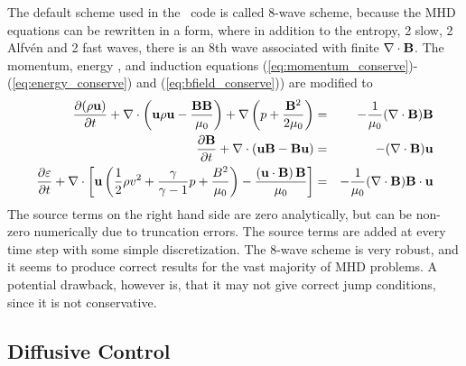 The default scheme used in the \BATSRUS\ code is called 8-wave scheme,
because the MHD equations can be rewritten in a form, where in addition
to the entropy, 2 slow, 2 Alfv\'en and 2 fast waves, there is an 8th 
wave associated with finite $\nabla\cdot\mathbf{B}$. The momentum, 
energy , and induction 
equations 
 (\ref{eq:momentum_conserve})- (\ref{eq:energy_conserve}) 
and (\ref{eq:bfield_conserve}))
are modified to
\begin{eqnarray}
  \frac{\partial (\rho\mathbf{u})}{\partial t}+
      \nabla\cdot\left(\mathbf{u}\rho\mathbf{u} - \frac{\mathbf{B}\mathbf{B}}{\mu_0}\right) + 
      \nabla\left(p + \frac{\mathbf{B}^2}{2\mu_0}\right)
      &=& -\frac{1}{\mu_0}(\nabla\cdot\mathbf{B})\mathbf{B}                    \label{q-momentum8} \\
  \frac{\partial\mathbf{B}}{\partial t} + \nabla\cdot(\mathbf{u}\mathbf{B} - \mathbf{B}\mathbf{u})
      &=& -(\nabla\cdot\mathbf{B})\mathbf{u}                    \label{q-induction8} \\
  \frac{\partial\varepsilon}{\partial t}+
      \nabla \cdot \left[ \mathbf{u} \left( \frac12 \rho v^2 + 
      \frac{\gamma}{\gamma-1} p +
      \frac{B^2}{\mu_0} \right) - 
      \frac{\left(\mathbf{u}\cdot\mathbf{B}\right)\mathbf{B}}{\mu_0}\right] 
      &=& -\frac{1}{\mu_0}(\nabla\cdot\mathbf{B})\mathbf{B}\cdot\mathbf{u}           \label{q-energy8}
\end{eqnarray}
The source terms on the right hand side are zero analytically, but
can be non-zero numerically due to truncation errors. The source
terms are added at every time step with some simple discretization.
The 8-wave scheme is very robust, and it seems to produce correct
results for the vast majority of MHD problems. A potential drawback,
however is, that it may not give correct jump conditions, since it
is not conservative.

\subsection{Diffusive Control \label{section:diffusive_control}}

